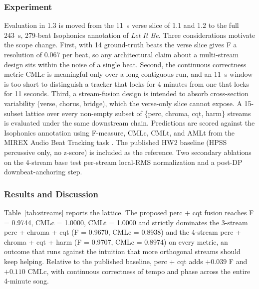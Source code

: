 \documentclass{article}
\begin{document}
\subsubsection{Experiment}
Evaluation in 1.3 is moved from the 11~s verse slice of 1.1 and 1.2 to the full 243~s, 279-beat Isophonics annotation of \textit{Let It Be}. Three considerations motivate the scope change. First, with 14 ground-truth beats the verse slice gives F a resolution of 0.067 per beat, so any architectural claim about a multi-stream design sits within the noise of a single beat. Second, the continuous correctness metric CMLc is meaningful only over a long contiguous run, and an 11~s window is too short to distinguish a tracker that locks for 4 minutes from one that locks for 11 seconds. Third, a stream-fusion design is intended to absorb cross-section variability (verse, chorus, bridge), which the verse-only slice cannot expose. A 15-subset lattice over every non-empty subset of \{perc, chroma, cqt, harm\} streams is evaluated under the same downstream chain. Predictions are scored against the Isophonics annotation using F-measure, CMLc, CMLt, and AMLt from the MIREX Audio Beat Tracking task \cite{mirex2025beat}. The published HW2 baseline (HPSS percussive only, no z-score) is included as the reference. Two secondary ablations on the 4-stream base test per-stream local-RMS normalization and a post-DP downbeat-anchoring step.

\subsubsection{Results and Discussion}
Table~\ref{tab:streams} reports the lattice. The proposed perc + cqt fusion reaches F = 0.9744, CMLc = 1.0000, CMLt = 1.0000 and strictly dominates the 3-stream perc + chroma + cqt (F = 0.9670, CMLc = 0.8938) and the 4-stream perc + chroma + cqt + harm (F = 0.9707, CMLc = 0.8974) on every metric, an outcome that runs against the intuition that more orthogonal streams should keep helping. Relative to the published baseline, perc + cqt adds $+0.039$ F and $+0.110$ CMLc, with continuous correctness of tempo and phase across the entire 4-minute song.
\end{document}
